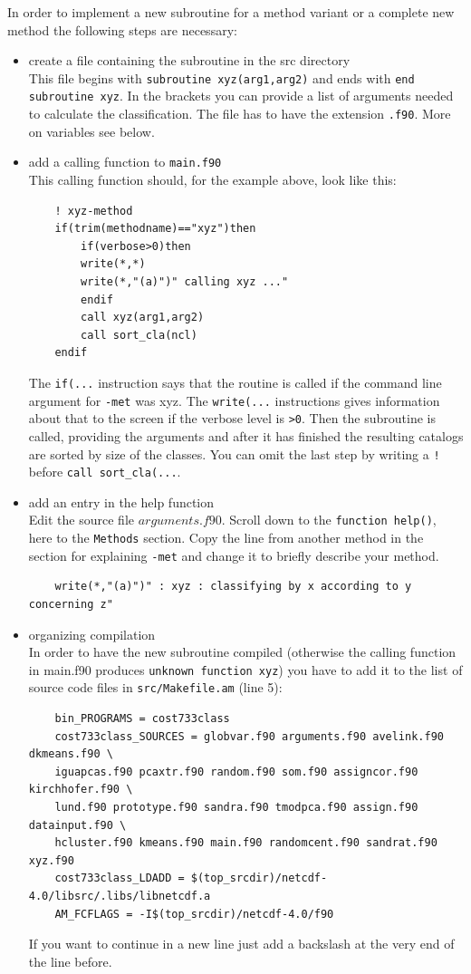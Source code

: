 \documentclass[12pt, oneside, a4paper, headsepline, plainheadsepline]{scrbook}
\begin{document}
In order to implement a new subroutine for a method variant or a complete new method the following steps are necessary:
\begin{itemize}

\item create a file containing the subroutine in the src directory \\
	This file begins with \texttt{subroutine xyz(arg1,arg2)} and ends with \texttt{end subroutine xyz}. 
	In the brackets you can provide a list of arguments needed to calculate the classification.
	The file has to have the extension \verb+.f90+. More on variables see below.

\item add a calling function to \verb+main.f90+ \\
	This calling function should, for the example above, look like this:
	\begin{lstlisting}
	! xyz-method
	if(trim(methodname)=="xyz")then
		if(verbose>0)then
        write(*,*)
        write(*,"(a)")" calling xyz ..."
     	endif
		call xyz(arg1,arg2)
		call sort_cla(ncl)
	endif
	\end{lstlisting}
	The \verb+if(...+ instruction says that the routine is called if the command line argument for \verb+-met+ was xyz.
	The \verb+write(...+ instructions gives information about that to the screen if the verbose level is \verb+>0+.
	Then the subroutine is called, providing the arguments and after it has finished the resulting catalogs are sorted by size
	of the classes. You can omit the last step by writing a \verb+!+ before \verb+call sort_cla(...+.
	
\item add an entry in the help function \\
	Edit the source file $arguments.f90$. Scroll down to the \verb+function help()+, here to the \verb+Methods+ section. 
	Copy the line from another method in the section for explaining \verb+-met+ and change it to briefly describe your method.
	\begin{lstlisting}
	write(*,"(a)")" : xyz : classifying by x according to y concerning z"
	\end{lstlisting}
	
\item organizing compilation \\
	In order to have the new subroutine compiled (otherwise the calling function in main.f90 produces \verb+unknown function xyz+)
	you have to add it to the list of source code files in \verb+src/Makefile.am+ (line 5):
	\begin{lstlisting}
	bin_PROGRAMS = cost733class
	cost733class_SOURCES = globvar.f90 arguments.f90 avelink.f90 dkmeans.f90 \
	iguapcas.f90 pcaxtr.f90 random.f90 som.f90 assigncor.f90 kirchhofer.f90 \
	lund.f90 prototype.f90 sandra.f90 tmodpca.f90 assign.f90 datainput.f90 \
	hcluster.f90 kmeans.f90 main.f90 randomcent.f90 sandrat.f90 xyz.f90
	cost733class_LDADD = $(top_srcdir)/netcdf-4.0/libsrc/.libs/libnetcdf.a
	AM_FCFLAGS = -I$(top_srcdir)/netcdf-4.0/f90
	\end{lstlisting}	
	If you want to continue in a new line just add a backslash at the very end of the line before.  
	

\end{itemize}
\end{document}
